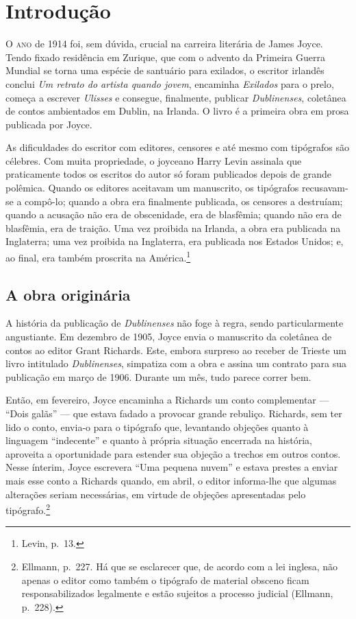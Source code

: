 \chapter[Introdução, por José Roberto O’Shea]{Introdução}

\textsc{O ano} de 1914 foi, sem dúvida, crucial na carreira literária de James
Joyce. Tendo fixado residência em Zurique, que com o advento da Primeira Guerra
Mundial se torna uma espécie de santuário para exilados, o escritor irlandês
conclui \textit{Um retrato do artista quando jovem}, encaminha \textit{Exilados} para o
prelo, começa a escrever \textit{Ulisses} e consegue, finalmente, publicar
\textit{Dublinenses}, coletânea de contos ambientados em Dublin, na Irlanda. O
livro é a primeira obra em prosa publicada por Joyce.

As dificuldades do escritor com editores, censores e até mesmo com tipógrafos
são célebres. Com muita propriedade, o joyceano Harry Levin assinala que
praticamente todos os escritos do autor só foram publicados depois de grande
polêmica. Quando os editores aceitavam um manuscrito, os tipógrafos
recusavam-se a compô-lo; quando a obra era finalmente publicada, os censores a
destruíam; quando a acusação não era de obscenidade, era de blasfêmia; quando
não era de blasfêmia, era de traição.  Uma vez proibida na Irlanda, a obra era
publicada na Inglaterra; uma vez proibida na Inglaterra, era publicada nos
Estados Unidos; e, ao final, era também proscrita na América.\footnote{ Levin, p.~13.}

\section{A obra originária}

A história da publicação de \textit{Dublinenses} não foge à regra, sendo
particularmente angustiante. Em dezembro de 1905, Joyce envia o manuscrito da
coletânea de contos ao editor Grant Richards. Este, embora surpreso ao receber
de Trieste um livro intitulado \textit{Dublinenses}, simpatiza com a obra e
assina um contrato para sua publicação em março de 1906. Durante um mês, tudo
parece correr bem.

Então, em fevereiro, Joyce encaminha a Richards um conto complementar --- “Dois
galãs” --- que estava fadado a provocar grande rebuliço. Richards, sem ter lido o
conto, envia-o para o tipógrafo que, levantando objeções quanto à linguagem
“indecente” e quanto à própria situação encerrada na história, aproveita a
oportunidade para estender sua objeção a trechos em outros contos. Nesse
ínterim, Joyce escrevera “Uma pequena nuvem” e estava prestes a enviar mais
esse conto a Richards quando, em abril, o editor informa-lhe que algumas
alterações seriam necessárias, em virtude de objeções apresentadas pelo
tipógrafo.\footnote{  Ellmann, p.~227. Há que se esclarecer que, de acordo com a
lei inglesa, não apenas o editor como também o tipógrafo de material obsceno
ficam responsabilizados legalmente e estão sujeitos a processo judicial
(Ellmann, p.~228).}


